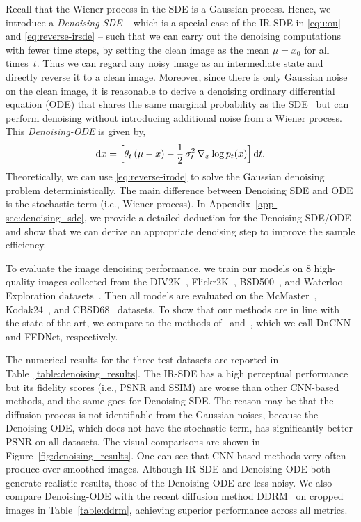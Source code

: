 \documentclass{article}
\newcommand{\diff}{\mathop{}\!\mathrm{d}}
\theoremstyle{plain}
\theoremstyle{definition}
\theoremstyle{remark}
\begin{document}
Recall that the Wiener process in the SDE is a Gaussian process. Hence, we introduce a \textit{Denoising-SDE} -- which is a special case of the IR-SDE in \eqref{equ:ou} and \eqref{eq:reverse-irsde} -- such that we can carry out the denoising computations with fewer time steps, by setting the clean image as the mean $\mu = {x}_0$ for all times~$t$.
Thus we can regard any noisy image as an intermediate state and directly reverse it to a clean image. Moreover, since there is only Gaussian noise on the clean image, it is reasonable to derive a denoising ordinary differential equation (ODE) that shares the same marginal probability as the SDE~\cite{song2021score} but can perform denoising without introducing additional noise from a Wiener process. This \textit{Denoising-ODE} is given by,
\begin{equation}
    \diff {x} = \Bigl[\theta_t \, (\mu - {x}) - \frac{1}{2} \, \sigma_t^2 \, \nabla_{{x}}\log p_t({x}) \Bigr]\diff t.
    \label{eq:reverse-irode}
\end{equation} 
Theoretically, we can use \eqref{eq:reverse-irode} to solve the Gaussian denoising problem deterministically. The main difference between Denoising SDE and ODE is the stochastic term (i.e., Wiener process). In Appendix~\ref{app-sec:denoising_sde}, we provide a detailed deduction for the Denoising SDE/ODE and show that we can derive an appropriate denoising step to improve the sample efficiency.


To evaluate the image denoising performance, we train our models on 8 high-quality images collected from the DIV2K~\cite{agustsson2017ntire}, Flickr2K~\cite{timofte2017ntire}, BSD500~\cite{arbelaez2010contour}, and Waterloo Exploration datasets~\cite{ma2016waterloo}. 
Then all models are evaluated on the McMaster~\cite{zhang2011color}, Kodak24~\cite{franzen1999kodak}, and CBSD68~\cite{martin2001database} datasets. To show that our methods are in line with the state-of-the-art, we compare to the methods of~\cite{zhang2017beyond} and~\cite{zhang2018ffdnet}, which we call DnCNN and FFDNet, respectively. 



The numerical results for the three test datasets are reported in Table~\ref{table:denoising_results}. The IR-SDE has a high perceptual performance but its fidelity scores (i.e., PSNR and SSIM) are worse than other CNN-based methods, and the same goes for Denoising-SDE. 
The reason may be that the diffusion process is not identifiable from the Gaussian noises, because the Denoising-ODE, which does not have the stochastic term, has significantly better PSNR on all datasets. The visual comparisons are shown in Figure~\ref{fig:denoising_results}. One can see that CNN-based methods very often produce over-smoothed images. Although IR-SDE and Denoising-ODE both generate realistic results, those of the Denoising-ODE are less noisy. We also compare Denoising-ODE with the recent diffusion method DDRM~\cite{kawar2022denoising} on cropped images in Table~\ref{table:ddrm}, achieving superior performance across all metrics.
\end{document}
